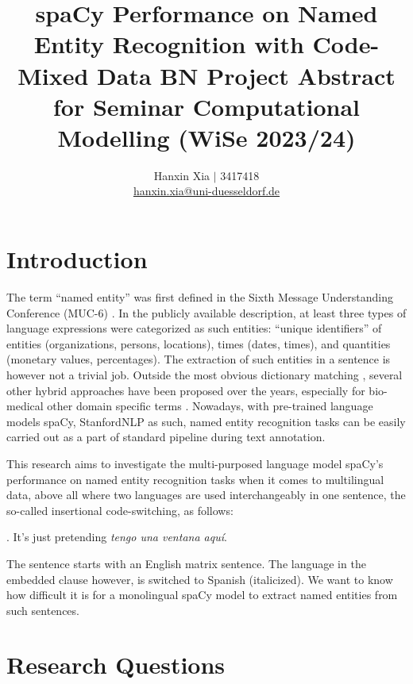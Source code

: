\documentclass[11pt]{article}
\title{spaCy Performance on Named Entity Recognition with Code-Mixed Data
\bigbreak \normalsize BN Project Abstract for Seminar Computational Modelling (WiSe 2023/24)}
\author{Hanxin Xia $\vert$ 3417418\\
  \href{mailto://hanxin.xia@uni-duesseldorf.de}{hanxin.xia@uni-duesseldorf.de}}
\begin{document}
\maketitle


\section{Introduction}

The term ``named entity'' was first defined in the Sixth Message Understanding Conference (MUC-6) \citep{grishman1996ner}. In the publicly available description, at least three types of language expressions were categorized as such entities: ``unique identifiers'' of entities (organizations, persons, locations), times (dates, times), and quantities (monetary values, percentages). The extraction of such entities in a sentence is however not a trivial job. Outside the most obvious dictionary matching \citep{higashinaka2012nerwiki,shang2018learning}, several other hybrid approaches have been proposed over the years, especially for bio-medical other domain specific terms \citep{rock2012nerbio,lou2020dicthyb}. Nowadays, with pre-trained language models spaCy, StanfordNLP as such, named entity recognition tasks can be easily carried out as a part of standard pipeline during text annotation.

This research aims to investigate the multi-purposed language model spaCy's performance on named entity recognition tasks when it comes to multilingual data, above all where two languages are used interchangeably in one sentence, the so-called insertional code-switching, as follows:

\ex. It's just pretending \textit{tengo una ventana aquí}.\\
  \citep[104]{arias2005esencs}

The sentence starts with an English matrix sentence. The language in the embedded clause however, is switched to Spanish (italicized). We want to know how difficult it is for a monolingual spaCy model to extract named entities from such sentences.


\section{Research Questions}
\end{document}
